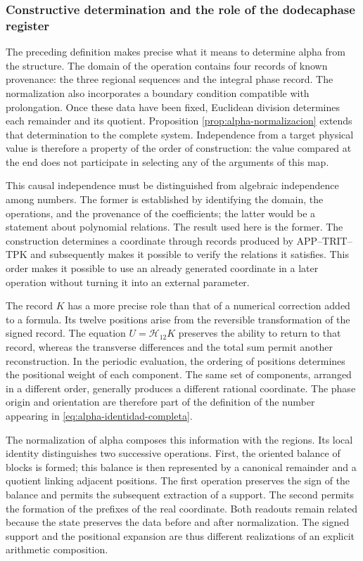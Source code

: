 \subsubsection{Constructive determination and the role of the dodecaphase register}
\label{alpha-ampl-dependencias}

The preceding definition makes precise what it means to determine alpha from
the structure. The domain of the operation contains four records of known
provenance: the three regional sequences and the integral phase record.
The normalization also incorporates a boundary condition compatible with
prolongation. Once these data have been fixed, Euclidean division determines
each remainder and its quotient. Proposition
\ref{prop:alpha-normalizacion} extends that determination to the complete
system. Independence from a target physical value is therefore a property
of the order of construction: the value compared at the end does not
participate in selecting any of the arguments of this map.

This causal independence must be distinguished from algebraic independence
among numbers. The former is established by identifying the domain, the
operations, and the provenance of the coefficients; the latter would be a
statement about polynomial relations. The result used here is the former.
The construction determines a coordinate through records produced by
APP--TRIT--TPK and subsequently makes it possible to verify the relations it
satisfies. This order makes it possible to use an already generated coordinate
in a later operation without turning it into an external parameter.

The record $K$ has a more precise role than that of a numerical correction
added to a formula. Its twelve positions arise from the reversible
transformation of the signed record. The equation
$U=\mathcal H_{12}K$ preserves the ability to return to that record,
whereas the transverse differences and the total sum permit another
reconstruction. In the periodic evaluation, the ordering of positions
determines the positional weight of each component. The same set of
components, arranged in a different order, generally produces a different
rational coordinate. The phase origin and orientation are therefore part of
the definition of the number appearing in \eqref{eq:alpha-identidad-completa}.

The normalization of alpha composes this information with the regions. Its
local identity distinguishes two successive operations. First, the oriented
balance of blocks is formed; this balance is then represented by a canonical
remainder and a quotient linking adjacent positions. The first operation
preserves the sign of the balance and permits the subsequent extraction of a
support. The second permits the formation of the prefixes of the real
coordinate. Both readouts remain related because the state preserves the data
before and after normalization. The signed support and the positional
expansion are thus different realizations of an explicit arithmetic
composition.

